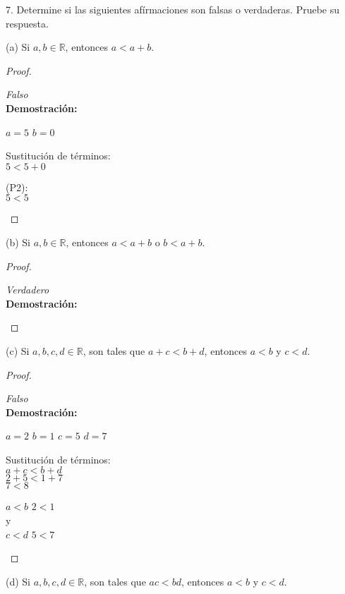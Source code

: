 \documentclass[12pt, a4paper]{article}
\begin{document}
7. Determine si las siguientes afírmaciones son falsas o verdaderas. Pruebe su respuesta.

(a) Si $a,b \in \mathbb{R}$, entonces $a < a + b$.
    \begin{proof}
        \begin{center}
            \textit{Falso}\\
            \textbf{Demostración:}
    
            $a = 5$ 
            $b = 0$
    
            Sustitución de términos:\\
            $5 < 5 + 0$
    
            (P2):\\
            $5 < 5$
    
        \end{center}
    \end{proof}
(b) Si $a,b \in \mathbb{R}$, entonces $a < a + b$ o $b < a + b$.
    \begin{proof}
        \begin{center}
            \textit{Verdadero}\\
            \textbf{Demostración:}
           
        \end{center}
    \end{proof}
(c) Si $a,b,c,d \in \mathbb{R}$, son tales que $a + c < b + d$, entonces $a < b$ y $c < d$.
    \begin{proof}
        \begin{center}
            \textit{Falso}\\
            \textbf{Demostración:}

            $a = 2$ $b = 1$ $c = 5$ $d = 7$
    
            Sustitución de términos:\\
            $a + c < b + d$\\
            $2+5<1+7$\\
            $7<8$

            $a<b$  $2<1$\\
            y\\
            $c<d$  $5<7$
    
        \end{center}
    \end{proof}
(d) Si $a,b,c,d \in \mathbb{R}$, son tales que $ac < bd$, entonces $a < b$ y $c < d$.
\end{document}
